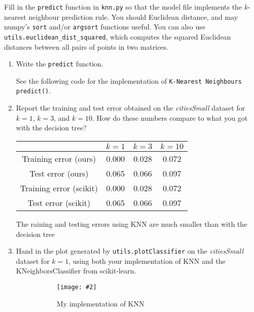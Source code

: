 \documentclass{article}
\def\blu#1{{\color{blu}#1}}
\def\ans#1{{\color{ans}#1}}
\newcommand{\centerfig}[2]{\begin{center}\texttt{[image: \#2]}\end{center}}
\def\enum#1{\begin{enumerate}#1\end{enumerate}}
\begin{document}
Fill in the \texttt{predict} function in \texttt{knn.py} so that the model file implements the $k$-nearest neighbour prediction rule.
You should Euclidean distance, and may numpy's \texttt{sort} and/or \texttt{argsort} functions useful.
You can also use \texttt{utils.euclidean\string_dist\string_squared}, which computes the squared Euclidean distances between all pairs of points in two matrices.
\blu{
\enum{
\item Write the \texttt{predict} function. \\
\ans{
   See the following code for the implementation of \texttt{K-Nearest Neighbours predict()}.
   \begin{center}
      
  \end{center}
}
\item Report  the training and test error obtained on the \emph{citiesSmall} dataset for $k=1$, $k=3$, and $k=10$. How do these numbers compare to what you got with the decision tree? \\
\ans{
   \scriptsize
   \setlength{\tabcolsep}{2pt}
   \begin{center}
   \begin{tabular}{SSSS} \toprule
      {} & {$k = 1$} & {$k = 3$} & {$k = 10$} \\ \midrule
      {Training error (ours)} & 0.000 & 0.028 & 0.072 \\ 
      {Test error (ours)} & 0.065 & 0.066 & 0.097 \\ \midrule
      {Training error (scikit)} & 0.000 & 0.028 & 0.072 \\ 
      {Test error (scikit)} & 0.065 & 0.066 & 0.097 \\ \bottomrule
   \end{tabular}
   \end{center}
   \normalsize
   The raining and testing errors using KNN are much smaller than with the decision tree
}
\item Hand in the plot generated by \texttt{utils.plotClassifier} on the \emph{citiesSmall} dataset for $k=1$, using both your implementation of KNN and the KNeighborsClassifier from scikit-learn.
\begin{figure}[htp]
   \begin{subfigure}[b]{0.5\textwidth} \color{ans}
       \centerfig{1}{../figs/q3_3_myKNN}
       {
          \begin{center}
            My implementation of KNN
          \end{center}
      }

\end{subfigure}
\end{figure}}}
\end{document}
